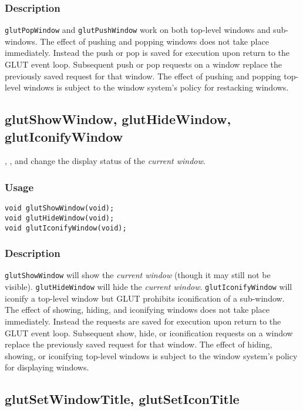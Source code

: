 \subsubsection*{Description}

{\tt glutPopWindow} and {\tt glutPushWindow} work on both top-level
windows and sub-windows.  The effect of pushing and popping windows
does not take place immediately.  Instead the push or pop is saved
for execution upon return to the GLUT event loop.  Subsequent
push or pop requests on a window replace the previously saved
request for that window.  The effect of pushing and popping
top-level windows is subject to the window system's policy for
restacking windows.

\subsection{glutShowWindow, glutHideWindow, glutIconifyWindow}

, , and 
change the display status of the {\em current window}.

\subsubsection*{Usage}
\begin{verbatim}
void glutShowWindow(void);
void glutHideWindow(void);
void glutIconifyWindow(void);
\end{verbatim}

\subsubsection*{Description}

{\tt glutShowWindow} will show the {\em current window} (though
it may still not be visible).  {\tt glutHideWindow} will hide
the {\em current window}.  {\tt glutIconifyWindow} will iconify
a top-level window but GLUT prohibits iconification of a sub-window.
The effect of showing, hiding, and iconifying windows does not
take place immediately.  Instead the requests are saved
for execution upon return to the GLUT event loop.
Subsequent show, hide, or iconification requests on a window
replace the previously saved request for that window.  The effect of hiding,
showing, or iconifying top-level windows is subject to the window
system's policy for displaying windows.

\subsection{glutSetWindowTitle, glutSetIconTitle}


